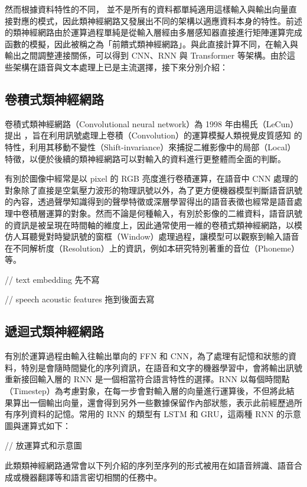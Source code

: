 然而根據資料特性的不同， 並不是所有的資料都單純適用這樣輸入與輸出向量直接對應的模式，因此類神經網路又發展出不同的架構以適應資料本身的特性。前述的類神經網路由於運算過程單純是從輸入層經由多層感知器直接進行矩陣運算完成函數的模擬，因此被稱之為「前饋式類神經網路」。與此直接計算不同，在輸入與輸出之間調整連接關係，可以得到 CNN、RNN 與 Transformer 等架構。由於這些架構在語音與文本處理上已是主流選擇，接下來分別介紹：

\subsection{卷積式類神經網路}

卷積式類神經網路（Convolutional neural network）為 1998 年由楊氏（LeCun）提出 \cite{lecun_gradient-based_1998}，旨在利用訊號處理上卷積（Convolution）的運算模擬人類視覺皮質感知 \cite{hubel_receptive_1959} 的特性，利用其移動不變性（Shift-invariance）來捕捉二維影像中的局部（Local）特徵，以便於後續的類神經網路可以對輸入的資料進行更整體而全面的判斷。

有別於圖像中經常是以 pixel 的 RGB 亮度進行卷積運算，在語音中 CNN 處理的對象除了直接是空氣壓力波形的物理訊號以外，為了更方便機器模型判斷語音訊號的內容，透過聲學知識得到的聲學特徵或深層學習得出的語音表徵也經常是語音處理中卷積層運算的對象。然而不論是何種輸入，有別於影像的二維資料，語音訊號的資訊是被呈現在時間軸的維度上，因此通常使用一維的卷積式類神經網路，以模仿人耳聽覺對時變訊號的窗框（Window）處理過程，讓模型可以觀察到輸入語音在不同解析度（Resolution）上的資訊，例如本研究特別著重的音位（Phoneme）等。

// text embedding 先不寫

// speech acoustic features 拖到後面去寫

\subsection{遞迴式類神經網路}

有別於運算過程由輸入往輸出單向的 FFN 和 CNN，為了處理有記憶和狀態的資料，特別是會隨時間變化的序列資訊，在語音和文字的機器學習中，會將輸出訊號重新接回輸入層的 RNN 是一個相當符合語言特性的選擇。RNN 以每個時間點（Timestep）為考慮對象，在每一步會對輸入層的向量進行運算後，不但將此結果算出一個輸出向量，還會得到另外一些數據保留作內部狀態，表示此前經歷過所有序列資料的記憶。常用的 RNN 的類型有 LSTM 和 GRU，這兩種 RNN 的示意圖與運算式如下：

// 放運算式和示意圖

此類類神經網路通常會以下列介紹的序列至序列的形式被用在如語音辨識、語音合成或機器翻譯等和語言密切相關的任務中。

